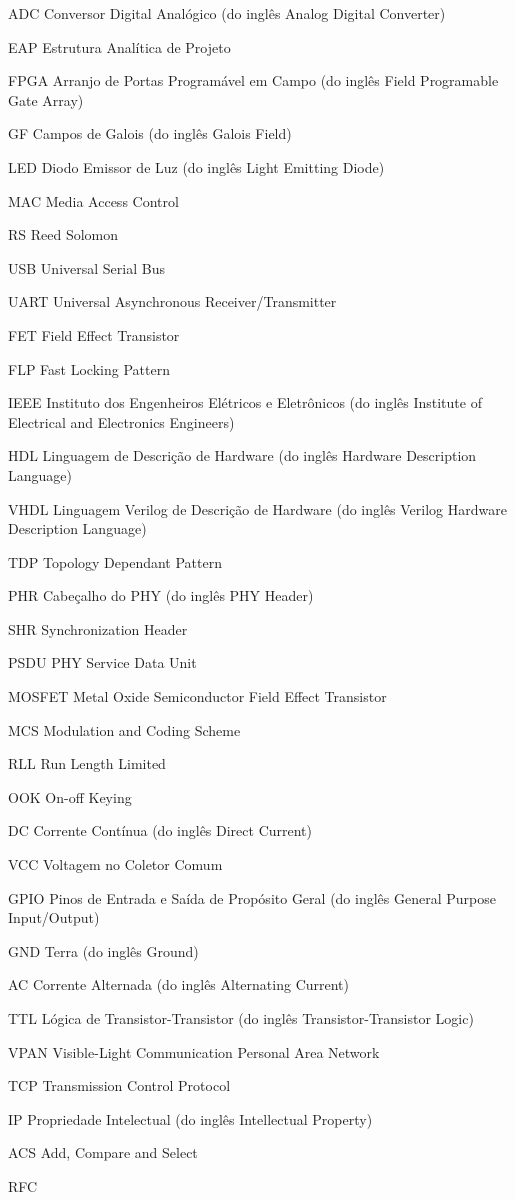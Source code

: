 \documentclass[
	12pt,				%
	openright,			%
	twoside,			%
	a4paper,			%
	hyphens,			%
	english,			%
	brazil				%
]{abntex2}
\begin{document}
	\begin{siglas}
		\item[ADC] Conversor Digital Analógico (do inglês Analog Digital Converter)
		\item[EAP] Estrutura Analítica de Projeto
		\item[FPGA] Arranjo de Portas Programável em Campo (do inglês Field Programable Gate Array)
		\item[GF] Campos de Galois (do inglês Galois Field)
		\item[LED] Diodo Emissor de Luz (do inglês Light Emitting Diode)
		\item[MAC] Media Access Control
		\item[RS] Reed Solomon
		\item[USB] Universal Serial Bus
		\item[UART] Universal Asynchronous Receiver/Transmitter
		\item[FET] Field Effect Transistor
		\item[FLP] Fast Locking Pattern
		\item[IEEE] Instituto dos Engenheiros Elétricos e Eletrônicos (do inglês Institute of Electrical and Electronics Engineers)
		\item[HDL] Linguagem de Descrição de Hardware (do inglês Hardware Description Language)
		\item[VHDL] Linguagem Verilog de Descrição de Hardware (do inglês Verilog Hardware Description Language)
		\item[TDP] Topology Dependant Pattern
		\item[PHR] Cabeçalho do PHY (do inglês PHY Header)
		\item[SHR] Synchronization Header
		\item[PSDU] PHY Service Data Unit
		\item[MOSFET] Metal Oxide Semiconductor Field Effect Transistor
		\item[MCS] Modulation and Coding Scheme
		\item[RLL] Run Length Limited
		\item[OOK] On-off Keying
		\item[DC] Corrente Contínua (do inglês Direct Current)
		\item[VCC] Voltagem no Coletor Comum
		\item[GPIO] Pinos de Entrada e Saída de Propósito Geral (do inglês General Purpose Input/Output)
		\item[GND] Terra (do inglês Ground)
		\item[AC] Corrente Alternada (do inglês Alternating Current)
		\item[TTL] Lógica de Transistor-Transistor (do inglês Transistor-Transistor Logic)
		\item[VPAN] Visible-Light Communication Personal Area Network
		\item[TCP] Transmission Control Protocol
		\item[IP] Propriedade Intelectual (do inglês Intellectual Property)
		\item[ACS] Add, Compare and Select
		\item[RFC] 
	\end{siglas}
	
\end{document}
